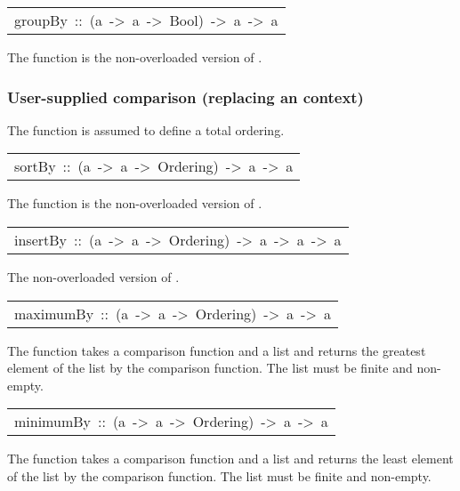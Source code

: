 \begin{haddockdesc}
\item[\begin{tabular}{@{}l}
groupBy\ ::\ (a\ ->\ a\ ->\ Bool)\ ->\ {\char 91}a{\char 93}\ ->\ {\char 91}{\char 91}a{\char 93}{\char 93}
\end{tabular}]\haddockbegindoc
The  function is the non-overloaded version of .
\par

\end{haddockdesc}
\subsubsection{User-supplied comparison (replacing an  context)
}
The function is assumed to define a total ordering.
\par

\begin{haddockdesc}
\item[\begin{tabular}{@{}l}
sortBy\ ::\ (a\ ->\ a\ ->\ Ordering)\ ->\ {\char 91}a{\char 93}\ ->\ {\char 91}a{\char 93}
\end{tabular}]\haddockbegindoc
The  function is the non-overloaded version of .
\par

\end{haddockdesc}
\begin{haddockdesc}
\item[\begin{tabular}{@{}l}
insertBy\ ::\ (a\ ->\ a\ ->\ Ordering)\ ->\ a\ ->\ {\char 91}a{\char 93}\ ->\ {\char 91}a{\char 93}
\end{tabular}]\haddockbegindoc
The non-overloaded version of .
\par

\end{haddockdesc}
\begin{haddockdesc}
\item[\begin{tabular}{@{}l}
maximumBy\ ::\ (a\ ->\ a\ ->\ Ordering)\ ->\ {\char 91}a{\char 93}\ ->\ a
\end{tabular}]\haddockbegindoc
The  function takes a comparison function and a list
 and returns the greatest element of the list by the comparison function.
 The list must be finite and non-empty.
\par

\end{haddockdesc}
\begin{haddockdesc}
\item[\begin{tabular}{@{}l}
minimumBy\ ::\ (a\ ->\ a\ ->\ Ordering)\ ->\ {\char 91}a{\char 93}\ ->\ a
\end{tabular}]\haddockbegindoc
The  function takes a comparison function and a list
 and returns the least element of the list by the comparison function.
 The list must be finite and non-empty.
\par

\end{haddockdesc}

